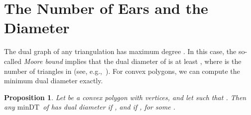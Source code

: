 \documentclass{article}
\newcommand{\MinDT}{\ensuremath{\mathrm{minDT}}}
\newtheorem{prop}[theorem]{Proposition}
\begin{document}
\section{The Number of Ears and the Diameter}\label{sec_ears}

The dual graph of any triangulation  has maximum degree . 
In this case,
the so-called \emph{Moore bound} implies that the dual diameter of 
 is at least , where  is the number of 
triangles in  (see, e.g.,~\cite{moore_survey}).
For convex polygons, we can compute the minimum dual diameter exactly.

\begin{prop}\label{prop_convex}
Let  be a convex polygon with  vertices, and let
 such that
. 
Then any 
\MinDT\ of   has dual diameter
   if
  ,
  and
   if
  , for
  some .
\end{prop}
\end{document}
